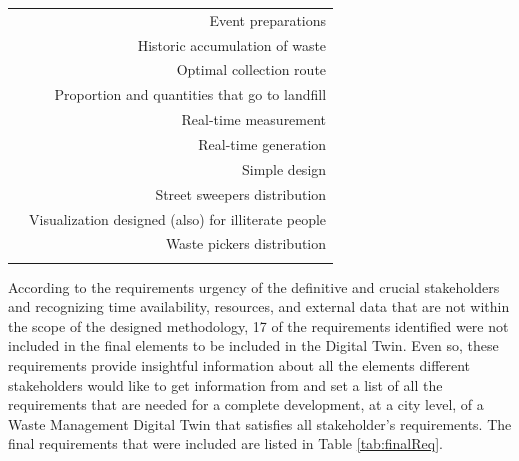 \documentclass[authoryear,preprint,review,12pt]{elsarticle}
\begin{document}
\begin{table}
\begin{tabularx}{\columnwidth}{X r}
                                    &Event preparations\\
                                    &Historic accumulation of waste\\
                                    &Optimal collection route\\
                                    &Proportion and quantities that go to landfill\\
                                    &Real-time measurement\\
                                    &Real-time generation\\
                                    &Simple design\\
                                    &Street sweepers distribution\\
                                    &Visualization designed (also) for illiterate people\\
                                    &Waste pickers distribution\\
        
            \bottomrule\\
        \end{tabularx}
    \end{table}

    According to the requirements urgency of the definitive and crucial stakeholders and recognizing time availability, resources, and external data that are not within the scope of the designed methodology, 17 of the requirements identified were not included in the final elements to be included in the Digital Twin. Even so, these requirements provide insightful information about all the elements different stakeholders would like to get information from and set a list of all the requirements that are needed for a complete development, at a city level, of a Waste Management Digital Twin that satisfies all stakeholder's requirements. The final requirements that were included are listed in Table \ref{tab:finalReq}.
\end{document}
